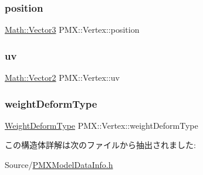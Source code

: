 \subsubsection{\texorpdfstring{position}{position}}
{\footnotesize\ttfamily \mbox{\hyperlink{struct_math_1_1_vector3}{Math\+::\+Vector3}} P\+M\+X\+::\+Vertex\+::position}

\mbox{\label{struct_p_m_x_1_1_vertex_a3de31d7167955c25cb574307108373b2}} 
\subsubsection{\texorpdfstring{uv}{uv}}
{\footnotesize\ttfamily \mbox{\hyperlink{struct_math_1_1_vector2}{Math\+::\+Vector2}} P\+M\+X\+::\+Vertex\+::uv}

\mbox{\label{struct_p_m_x_1_1_vertex_a0057bfb3e0ab2424a3f65b23f502fe11}} 
\subsubsection{\texorpdfstring{weight\+Deform\+Type}{weightDeformType}}
{\footnotesize\ttfamily \mbox{\hyperlink{namespace_p_m_x_a1a0e8dce30cb158a0c0d66cea0bf0f51}{Weight\+Deform\+Type}} P\+M\+X\+::\+Vertex\+::weight\+Deform\+Type}



この構造体詳解は次のファイルから抽出されました\+:\begin{DoxyCompactItemize}
\item 
Source/\mbox{\hyperlink{_p_m_x_model_data_info_8h}{P\+M\+X\+Model\+Data\+Info.\+h}}\end{DoxyCompactItemize}
